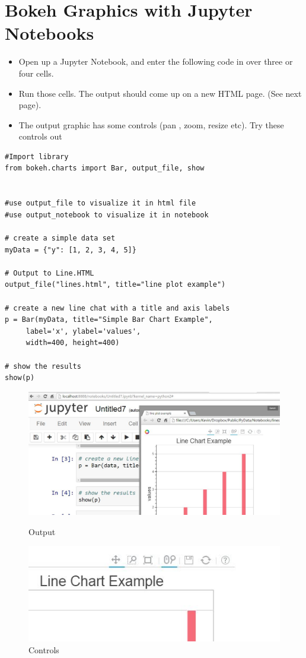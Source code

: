 \documentclass[a4paper,12pt]{article}
\begin{document}
	\large
\section*{Bokeh Graphics with Jupyter Notebooks}
\begin{itemize}
\item Open up a Jupyter Notebook, and enter the following code in over three or four cells.
\item Run those cells. The output should come up on a new HTML page. (See next page).
\item The output graphic has some controls (pan , zoom, resize etc). Try these controls out
\end{itemize}
\begin{framed}
\begin{verbatim}
#Import library
from bokeh.charts import Bar, output_file, show 


#use output_file to visualize it in html file
#use output_notebook to visualize it in notebook

# create a simple data set
myData = {"y": [1, 2, 3, 4, 5]}

# Output to Line.HTML
output_file("lines.html", title="line plot example") 

# create a new line chat with a title and axis labels
p = Bar(myData, title="Simple Bar Chart Example",
     label='x', ylabel='values', 
     width=400, height=400)

# show the results
show(p)

\end{verbatim}
\end{framed}
\newpage
\begin{figure}[h!]
\centering
\includegraphics[width=0.9\linewidth]{images/OutPut}
\caption{Output}\vspace{0.5cm}
\includegraphics[width=0.8\linewidth]{images/TopRightCorner}
\caption{Controls}
\end{figure}
\end{document}
